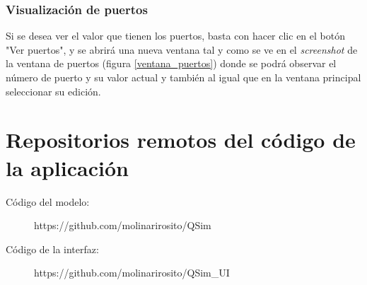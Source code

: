 
\subsubsection{Visualización de puertos}
Si se desea ver el valor que tienen los puertos, basta con hacer clic en el botón "Ver puertos", y se abrirá una nueva ventana tal y como se ve en el \textit{screenshot} de la ventana de puertos (figura \ref{ventana_puertos}) donde se podrá observar el número de puerto y su valor actual y también al igual que en la ventana principal seleccionar su edición.
\\


\section{Repositorios remotos del código de la aplicación}

\begin{description}
\item[Código del modelo:]
https://github.com/molinarirosito/QSim
\item[Código de la interfaz:]
https://github.com/molinarirosito/QSim\_UI
\end{description}
